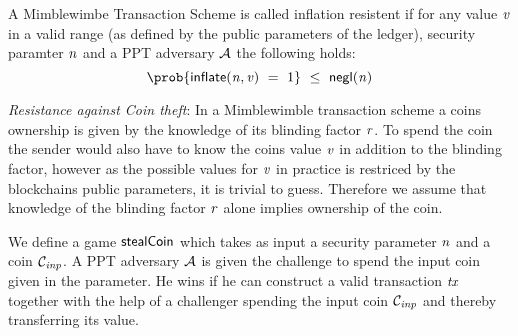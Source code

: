 \begin{center}
\end{center}

\begin{definition}
    A Mimblewimbe Transaction Scheme is called inflation resistent if for any value $\mathit{v}$ in a valid range (as defined by the public parameters of the ledger), security
    paramter $\mathit{n}$ and a PPT adversary $\mathcal{A}$ the following holds:
    \[ \prob{\procInflate{\varN}{\varValue} \opEqNoQ 1} \opSmEq \funNegl{\varN} \]
\end{definition}

\emph{Resistance against Coin theft}: In a Mimblewimble transaction scheme a coins ownership is given by the knowledge of its blinding factor $\mathit{r}$. To spend the coin the sender would also have to know the coins value $\mathit{v}$ in addition
to the blinding factor, however as the possible values for $\mathit{v}$ in practice is restriced by the blockchains public parameters, it is trivial to guess.
Therefore we assume that knowledge of the blinding factor $\mathit{r}$ alone implies ownership of the coin.

We define a game $\mathsf{stealCoin}$ which takes as input a security parameter $\mathit{n}$ and a coin $\mathcal{C}_{\mathit{inp}}$. A PPT adversary $\mathcal{A}$ is given the challenge to spend the input coin given in the parameter.
He wins if he can construct a valid transaction $\mathit{tx}$ together with the help of a challenger spending the input coin $\mathcal{C}_{\mathit{inp}}$ and thereby transferring its value.

